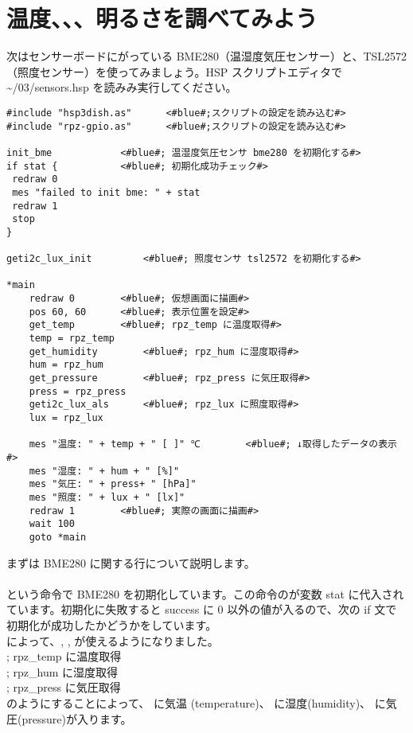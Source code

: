 \section{温度、、、明るさを調べてみよう}\label{sec:sensors}
次はセンサーボードにがっている BME280（温湿度気圧センサー）と、TSL2572（照度センサー）を使ってみましょう。HSP スクリプトエディタで\textasciitilde /03/sensors.hsp を読みみ実行してください。\\

\begin{lstlisting}[caption=\textasciitilde/03/sensors.hsp,label=sensors.hsp]
#include "hsp3dish.as"		<#blue#;スクリプトの設定を読み込む#>
#include "rpz-gpio.as"		<#blue#;スクリプトの設定を読み込む#>

init_bme			<#blue#; 温湿度気圧センサ bme280 を初期化する#>
if stat { 			<#blue#; 初期化成功チェック#>
 redraw 0
 mes "failed to init bme: " + stat
 redraw 1
 stop
}

geti2c_lux_init 		<#blue#; 照度センサ tsl2572 を初期化する#>

*main
	redraw 0 		<#blue#; 仮想画面に描画#>
	pos 60, 60 		<#blue#; 表示位置を設定#>
	get_temp		<#blue#; rpz_temp に温度取得#>
	temp = rpz_temp
	get_humidity		<#blue#; rpz_hum に湿度取得#>
	hum = rpz_hum
	get_pressure		<#blue#; rpz_press に気圧取得#>
	press = rpz_press
	geti2c_lux_als		<#blue#; rpz_lux に照度取得#>
	lux = rpz_lux

	mes "温度: " + temp + " [ ]" ℃		<#blue#; ↓取得したデータの表示#>
	mes "湿度: " + hum + " [%]"
	mes "気圧: " + press+ " [hPa]"
	mes "照度: " + lux + " [lx]"
	redraw 1		<#blue#; 実際の画面に描画#>
	wait 100
	goto *main
\end{lstlisting}

まずは BME280 に関する行について説明します。\\
\\
という命令で BME280 を初期化しています。この命令のが変数 stat に代入されています。初期化に失敗すると success に 0 以外の値が入るので、次の if 文で初期化が成功したかどうかをしています。\\
 によって、, ,  が使えるようになりました。\\
	; rpz\_temp に温度取得\\
	; rpz\_hum に湿度取得\\
	; rpz\_press に気圧取得\\
のようにすることによって、 に気温 (temperature)、  に湿度(humidity)、 に気圧(pressure)が入ります。

